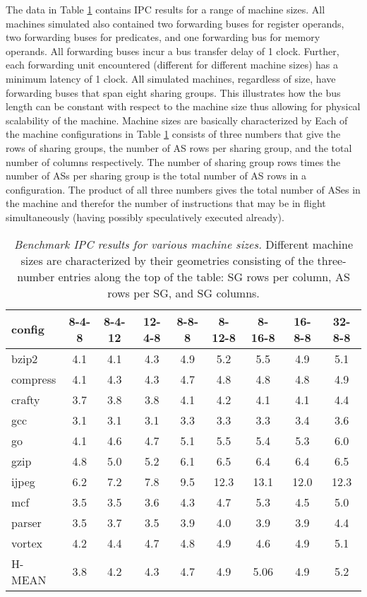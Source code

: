 \documentclass[10pt,dvips]{article}
\begin{document}
%
The data in Table \ref{tab:ipc1} contains IPC 
results for a range of machine sizes.
All machines simulated also contained two forwarding buses for
register operands, two forwarding buses for predicates, and
one forwarding bus for memory operands.
All forwarding buses incur a bus transfer delay of 1 clock.
Further, each forwarding unit encountered (different for different
machine sizes) has a minimum latency of 1 clock.
All simulated machines, regardless of size, have forwarding buses
that span eight sharing groups.  This illustrates how the bus
length can be constant with respect to the machine size thus allowing
for physical scalability of the machine.
Machine sizes are basically characterized by
Each of the machine configurations in Table \ref{tab:ipc1} consists of three
numbers that give the rows of sharing groups, the number
of AS rows per sharing group, and the total number of 
columns respectively.  The number of sharing group rows times the
number of ASs per sharing group is the total number of
AS rows in a configuration.  The product of all three
numbers gives the total number of ASes in the machine and therefor
the number of instructions that may be in flight 
simultaneously
(having
possibly speculatively executed already).
%
\begin{table}
\begin{center}
\caption{{\em Benchmark IPC results for various machine sizes.}
Different machine sizes are characterized by their
geometries consisting of the three-number entries along the
top of the table: SG rows per column, AS rows per SG, and
SG columns.}
\label{tab:ipc1}
\begin{tabular}{|l|c|c|c|c|c|c|c|c|}
\hline 
config&
8-4-8&8-4-12&12-4-8&8-8-8&8-12-8&8-16-8&16-8-8&32-8-8\\
\hline
\hline 
bzip2&4.1&4.1&4.3&4.9&5.2&5.5&4.9&5.1\\
\hline 
compress&4.1&4.3&4.3&4.7&4.8&4.8&4.8&4.9\\
\hline 
crafty&3.7&3.8&3.8&4.1&4.2&4.1&4.1&4.4\\
\hline 
gcc&3.1&3.1&3.1&3.3&3.3&3.3&3.4&3.6\\
\hline 
go&4.1&4.6&4.7&5.1&5.5&5.4&5.3&6.0\\
\hline 
gzip&4.8&5.0&5.2&6.1&6.5&6.4&6.4&6.5\\
\hline 
ijpeg&6.2&7.2&7.8&9.5&12.3&13.1&12.0&12.3\\
\hline 
mcf&3.5&3.5&3.6&4.3&4.7&5.3&4.5&5.0\\
\hline 
parser&3.5&3.7&3.5&3.9&4.0&3.9&3.9&4.4\\
\hline 
vortex&4.2&4.4&4.7&4.8&4.9&4.6&4.9&5.1\\
\hline 
\hline 
H-MEAN&3.8&4.2&4.3&4.7&4.9&5.06&4.9&5.2\\
\hline
\end{tabular}
\end{center}
\end{table}
\end{document}
